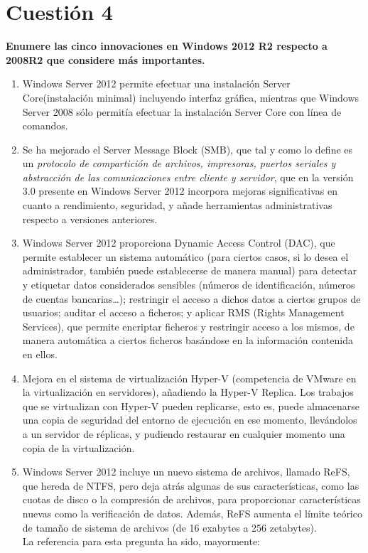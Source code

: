 \documentclass[a4paper,11pt]{article}
\newenvironment{answer}{%
\begin{list}{}{%
\addtolength{\hoffset}{0cm}
}%
\item[]}{\end{list}}
\begin{document}
\section{Cuestión 4}
\textbf{Enumere las cinco innovaciones en Windows 2012 R2 respecto a 2008R2 que considere más importantes.}
\begin{answer}
\begin{enumerate}
 \item \cite{smbi} Windows Server 2012 permite efectuar una instalación Server Core(instalación minimal) incluyendo interfaz gráfica,
 mientras que Windows Server 2008 sólo permitía efectuar la instalación Server Core con línea de comandos.
 
 \item Se ha mejorado el Server Message Block (SMB), que tal y como lo define \cite{smb} es un 
 \textit{protocolo de compartición de archivos, impresoras, puertos seriales y abstracción de las comunicaciones entre 
 cliente y servidor}, que en la versión 3.0 presente en Windows Server 2012 incorpora mejoras significativas en cuanto a 
 rendimiento, seguridad, y añade herramientas administrativas respecto a versiones anteriores.
 
 \item \cite{dac}Windows Server 2012 proporciona Dynamic Access Control (DAC), que permite establecer un sistema automático (para
 ciertos casos, si lo desea el administrador, también puede establecerse de manera manual) para detectar y etiquetar
 datos considerados sensibles (números de identificación, números de cuentas bancarias\ldots); restringir el acceso a
 dichos datos a ciertos grupos de usuarios; auditar el acceso a ficheros; y aplicar RMS (Rights Management Services), que permite
 encriptar ficheros y restringir acceso a los mismos, de manera automática a ciertos ficheros basándose en la información contenida en ellos.
 
 \item Mejora en el sistema de virtualización Hyper-V (competencia de VMware en la virtualización en servidores),
 añadiendo la Hyper-V Replica. Los trabajos que se virtualizan con Hyper-V pueden replicarse, esto es, puede almacenarse
 una copia de seguridad del entorno de ejecución en ese momento, llevándolos a un servidor de réplicas, y pudiendo
 restaurar en cualquier momento una copia de la virtualización.
 
 \item Windows Server 2012 incluye un nuevo sistema de archivos, llamado ReFS, que hereda de NTFS, pero deja atrás
 algunas de sus características, como las cuotas de disco o la compresión de archivos, para proporcionar características
 nuevas como la verificación de datos. Además, ReFS aumenta el límite teórico de tamaño de sistema de archivos (de 16
 exabytes a 256 zetabytes).\\
 
 La referencia para esta pregunta ha sido, mayormente: \cite{techr}	
\end{enumerate}
\end{answer}
\end{document}
